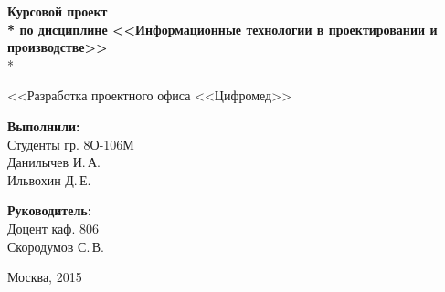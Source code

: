 \begin{titlepage}
\begin{center}
\vspace{2em}

\Large \textbf{Курсовой проект \\*
по дисциплине <<Информационные технологии в проектировании и производстве>>} \\*

\vspace{2em}

<<Разработка проектного офиса <<Цифромед>>
\end{center}

\vspace{6em}

\begin{minipage}[b]{22em}
  {\bfseries Выполнили:} \\
  \indent Студенты гр. 8О-106М \\
  \indent Данилычев И.\,А. \\
  \indent Ильвохин Д.\,Е.
\end{minipage} \begin{minipage}[b]{10em}
  {\bfseries Руководитель:} \\
  \indent Доцент каф. 806 \\
  \indent Скородумов С.\,В. \\
\end{minipage}
\vspace{\fill}

\begin{center}
Москва, 2015
\end{center}

\end{titlepage}
